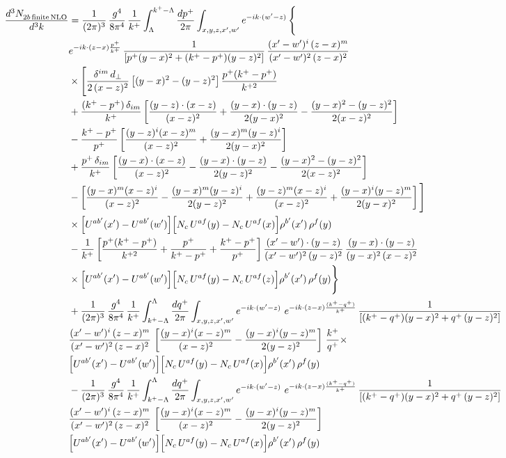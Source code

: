 \documentclass[9pt]{article}
\numberwithin{equation}{section}
\begin{document}
\begin{align}
    \frac{d^{3}N_{2b\,\rm finite\, NLO}^{\rm}}{d^{3}k} & = \frac{1}{(2\pi)^{3}}\,\frac{g^{4}}{8\pi^{4}}\,\frac{1}{k^{+}}\int_{\Lambda}^{k^{+}-\Lambda}\frac{dp^{+}}{2\pi}\int_{x,y,z,x',w'}e^{-ik\cdot(w'-z)}\,\Bigg\{\notag\\
&e^{-ik\cdot(z-x)\frac{p^{+}}{k^{+}}}\,\frac{1}{\left[p^{+}(y-x)^{2}+(k^{+}-p^{+})(y-z)^{2}\right]}\,\frac{(x'-w')^{i}\,(z-x)^{m}}{(x'-w')^{2}\,(z-x)^{2}}\notag\\
&\times\Bigg[\frac{\delta^{im}\,d_{\perp}}{2\,(x-z)^{2}}\left[(y-x)^{2}-(y-z)^{2}\right]\frac{p^{+}(k^{+}-p^{+})}{k^{+2}}
\notag \\ & +\frac{(k^{+}-p^{+})\,\delta_{im}}{k^{+}}\left[\frac{(y-z)\cdot(x-z)}{(x-z)^{2}}+\frac{(y-x)\cdot(y-z)}{2(y-x)^{2}}-\frac{(y-x)^{2}-(y-z)^{2}}{2(x-z)^{2}}\right]\notag\\
&-\frac{k^{+}-p^{+}}{p^{+}}\left[\frac{(y-z)^{i}(x-z)^{m}}{(x-z)^{2}}+\frac{(y-x)^{m}(y-z)^{i}}{2(y-x)^{2}}\right]\notag\\
&+\frac{p^{+}\,\delta_{im}}{k^{+}}\left[\frac{(y-x)\cdot(x-z)}{(x-z)^{2}}-\frac{(y-x)\cdot(y-z)}{2(y-z)^{2}}-\frac{(y-x)^{2}-(y-z)^{2}}{2(x-z)^{2}}\right]\notag\\
&-\left[\frac{(y-x)^{m}(x-z)^{i}}{(x-z)^{2}}-\frac{(y-x)^{m}(y-z)^{i}}{2(y-z)^{2}}+\frac{(y-z)^{m}(x-z)^{i}}{(x-z)^{2}}+\frac{(y-x)^{i}(y-z)^{m}}{2(y-x)^{2}}\right]\Bigg]\notag\\
&\times\Big[U^{ab'}(x')-U^{ab'}(w')\Big]\Big[N_{c}\,U^{af}(y)-N_{c}\,U^{af}(x)\Big]\rho^{b'}(x')\,\rho^{f}(y)\notag\\
&-\frac{1}{k^{+}}\left[\frac{p^{+}(k^{+}-p^{+})}{k^{+2}}+\frac{p^{+}}{k^{+}-p^{+}}+\frac{k^{+}-p^{+}}{p^{+}}\right]
\frac{(x'-w')\cdot(y-z)}{(x'-w')^{2}\,(y-z)^{2}}\,\frac{(y-x)\cdot(y-z)}{(y-x)^{2}\,(x-z)^{2}}\notag\\
&\times\Big[U^{ab'}(x')-U^{ab'}(w')\Big]\Big[N_{c}\,U^{af}(y)-N_{c}\,U^{af}(z)\Big]\rho^{b'}(x')\,\rho^{f}(y)\Bigg\}\notag \\ &  + \frac{1}{(2\pi)^{3}}\,\frac{g^{4}}{8\pi^{4}}\,\frac{1}{k^{+}}\int_{k^{+}-\Lambda}^{\Lambda}\frac{dq^{+}}{2\pi}\int_{x,y,z,x',w'}e^{-ik\cdot(w'-z)}\ e^{-ik\cdot(z-x)\frac{(k^{+}-q^{+})}{k^{+}}}\,\frac{1}{\left[(k^{+}-q^{+})(y-x)^{2}+q^{+}\,(y-z)^{2}\right]}\notag \\ & \frac{(x'-w')^{i}\,(z-x)^{m}}{(x'-w')^{2}\,(z-x)^{2}}\,\left[\frac{(y-x)^{i}(x-z)^{m}}{(x-z)^{2}}-\frac{(y-x)^{i}(y-z)^{m}}{2(y-z)^{2}}\right]\,\frac{k^{+}}{q^{+}}\times\notag \\ & \Big[U^{ab'}(x')-U^{ab'}(w')\Big]\Big[N_{c}\,U^{af}(y)-N_{c}\,U^{af}(x)\Big]\rho^{b'}(x')\,\rho^{f}(y)\notag \\ & - \frac{1}{(2\pi)^{3}}\,\frac{g^{4}}{8\pi^{4}}\,\frac{1}{k^{+}}\int_{k^{+}-\Lambda}^{\Lambda}\frac{dq^{+}}{2\pi}\int_{x,y,z,x',w'}e^{-ik\cdot(w'-z)}\ e^{-ik\cdot(z-x)\frac{(k^{+}-q^{+})}{k^{+}}}\,\frac{1}{\left[(k^{+}-q^{+})(y-x)^{2}+q^{+}\,(y-z)^{2}\right]}\notag \\ & \frac{(x'-w')^{i}\,(z-x)^{m}}{(x'-w')^{2}\,(z-x)^{2}}\,\left[\frac{(y-x)^{i}(x-z)^{m}}{(x-z)^{2}}-\frac{(y-x)^{i}(y-z)^{m}}{2(y-z)^{2}}\right]\notag \\ & \Big[U^{ab'}(x')-U^{ab'}(w')\Big]\Big[N_{c}\,U^{af}(y)-N_{c}\,U^{af}(x)\Big]\rho^{b'}(x')\,\rho^{f}(y)

\end{align}
\end{document}

